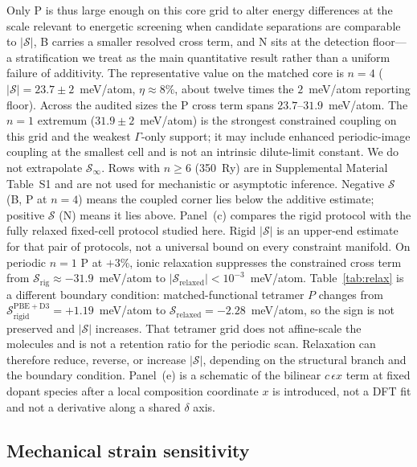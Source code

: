 \documentclass[%
 reprint,
 groupedaddress,
 amsmath,amssymb,
 aps,
 prb,
 floatfix,
]{revtex4-2}
\begin{document}
Only P is thus large enough on this core grid to alter energy differences at the scale relevant to energetic screening when candidate separations are comparable to $|\mathcal{S}|$, B carries a smaller resolved cross term, and N sits at the detection floor---a stratification we treat as the main quantitative result rather than a uniform failure of additivity.
The representative value on the matched core is $n{=}4$ ($|\mathcal{S}|=23.7\pm 2$~meV/atom, $\eta\approx 8\%$, about twelve times the $2$~meV/atom reporting floor). Across the audited sizes the P cross term spans $23.7$--$31.9$~meV/atom. The $n{=}1$ extremum ($31.9\pm 2$~meV/atom) is the strongest constrained coupling on this grid and the weakest $\Gamma$-only support; it may include enhanced periodic-image coupling at the smallest cell and is not an intrinsic dilute-limit constant.
We do not extrapolate $\mathcal{S}_\infty$.
Rows with $n\geq 6$ (350~Ry) are in Supplemental Material Table~S1 and are not used for mechanistic or asymptotic inference.
Negative $\mathcal{S}$ (B, P at $n{=}4$) means the coupled corner lies below the additive estimate; positive $\mathcal{S}$ (N) means it lies above.
Panel~(c) compares the rigid protocol with the fully relaxed fixed-cell protocol studied here. Rigid $|\mathcal{S}|$ is an upper-end estimate for that pair of protocols, not a universal bound on every constraint manifold.
On periodic $n{=}1$ P at $+3$\%, ionic relaxation suppresses the constrained cross term from $\mathcal{S}_{\mathrm{rig}}\approx -31.9$~meV/atom to $|\mathcal{S}_{\mathrm{relaxed}}|<10^{-3}$~meV/atom.
Table~\ref{tab:relax} is a different boundary condition: matched-functional tetramer $P$ changes from $\mathcal{S}_{\mathrm{rigid}}^{\mathrm{PBE+D3}}=+1.19$~meV/atom to $\mathcal{S}_{\mathrm{relaxed}}=-2.28$~meV/atom, so the sign is not preserved and $|\mathcal{S}|$ increases.
That tetramer grid does not affine-scale the molecules and is not a retention ratio for the periodic scan.
Relaxation can therefore reduce, reverse, or increase $|\mathcal{S}|$, depending on the structural branch and the boundary condition.
Panel~(e) is a schematic of the bilinear $c\,\epsilon x$ term at fixed dopant species after a local composition coordinate $x$ is introduced, not a DFT fit and not a derivative along a shared $\delta$ axis.

\subsection{\label{sec:strain_response}Mechanical strain sensitivity}
\end{document}
